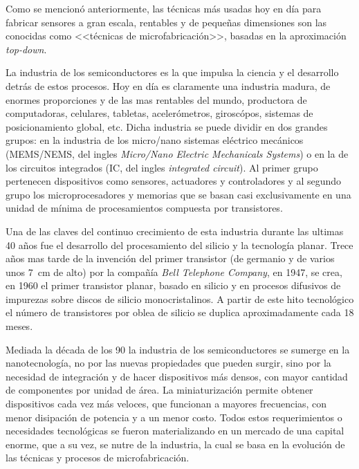 		Como se mencionó anteriormente, las técnicas más usadas hoy en día para fabricar sensores a gran escala, rentables y de pequeñas dimensiones son las conocidas como <<técnicas de microfabricación>>, basadas en la aproximación \textit{top-down}. \cite{Jaeger2001}

		La industria de los semiconductores es la que impulsa la ciencia y el desarrollo detrás de estos procesos. Hoy en día es claramente una industria madura, de enormes proporciones y de las mas rentables del mundo, productora de computadoras, celulares, tabletas, acelerómetros, giroscópos, sistemas de posicionamiento global, etc. Dicha industria se puede dividir en dos grandes grupos: en la industria de los micro/nano sistemas eléctrico mecánicos (MEMS/NEMS, del ingles \textit{Micro/Nano Electric Mechanicals Systems}) o en la de los circuitos integrados (IC, del ingles \textit{integrated circuit}). Al primer grupo pertenecen dispositivos como sensores, actuadores y controladores y al segundo grupo los microprocesadores y memorias que se basan casi exclusivamente en una unidad de mínima de procesamientos compuesta por transistores.\cite{Franssila2004,Jaeger2001,Madou2002}

		Una de las claves del continuo crecimiento de esta industria durante las ultimas 40 años fue el desarrollo del procesamiento del silicio y la tecnología planar. Trece años mas tarde de la invención del primer transistor (de germanio y de varios unos \SI{7}{\cm} de alto) por la compañía \textit{Bell Telephone Company}, en 1947, se crea, en 1960 el primer transistor planar, basado en silicio y en procesos difusivos de impurezas sobre discos de silicio monocristalinos. A partir de este hito tecnológico el número de transistores por oblea de silicio se duplica aproximadamente cada 18 meses. \cite{moore2006,riordan1999,fagen1984}
		
		Mediada la década de los 90 la industria de los semiconductores se sumerge en la nanotecnología, no por las nuevas propiedades que pueden surgir, sino por la necesidad de integración y de hacer dispositivos más densos, con mayor cantidad de componentes por unidad de área. La miniaturización permite obtener dispositivos cada vez más  veloces, que funcionan a mayores frecuencias, con menor disipación de potencia y a un menor costo. Todos estos requerimientos o necesidades tecnológicas se fueron materializando en un mercado de una capital enorme, que a su vez, se nutre de la industria, la cual se basa en la evolución de las técnicas y procesos de microfabricación.

